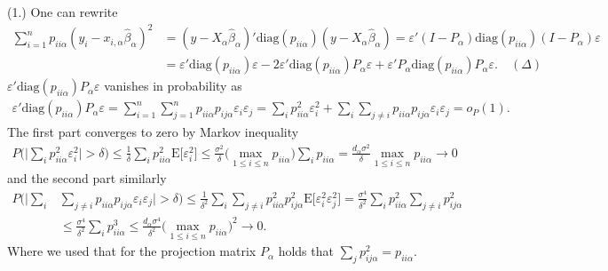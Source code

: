 \documentclass[Research_Module_ES.tex]{subfiles}
\begin{document}
(1.) One can rewrite 
\begin{align*}
\sum_{i=1}^n p_{ii\alpha}(y_i-x_{i,\alpha}\hat{\beta}_\alpha)^2 &= (y-X_\alpha\hat{\beta}_\alpha)'\mathrm{diag}(p_{ii\alpha})(y-X_\alpha\hat{\beta}_\alpha) 
= \varepsilon'(I-P_\alpha)\mathrm{diag}(p_{ii\alpha})(I-P_\alpha)\varepsilon\\
&= \varepsilon'\mathrm{diag}(p_{ii\alpha})\varepsilon-2\varepsilon'\mathrm{diag}(p_{ii\alpha})P_\alpha\varepsilon+\varepsilon'P_\alpha\mathrm{diag}(p_{ii\alpha})P_\alpha \varepsilon. \quad (\Delta)
\end{align*}
$\varepsilon'\mathrm{diag}(p_{ii\alpha})P_\alpha\varepsilon$ vanishes in probability as
\begin{align*}
\varepsilon'\mathrm{diag}(p_{ii\alpha})P_\alpha\varepsilon= \sum_{i=1}^n\sum_{j=1}^np_{ii\alpha}p_{ij\alpha}\varepsilon_i\varepsilon_j
=\sum_{i}p_{ii\alpha}^2\varepsilon_i^2 + \sum_{i}\sum_{j\neq i}p_{ii\alpha}p_{ij\alpha}\varepsilon_i\varepsilon_j=o_P(1).
\end{align*}
The first part converges to zero by Markov inequality 
\begin{align*}
P\biggl(\biggl|\sum_{i}p_{ii\alpha}^2\varepsilon_i^2\biggr|>\delta\biggr)
\le \frac{1}{\delta}\sum_{i}p_{ii\alpha}^2\mathrm{E}\bigl[\varepsilon_i^2\bigr]
\le \frac{\sigma^2}{\delta}\biggl(\max_{1\le i\le n}p_{ii\alpha}\biggr) \sum_{i}p_{ii\alpha} 
= \frac{d_\alpha\sigma^2}{\delta}\max_{1\le i\le n}p_{ii\alpha} \to 0 
\end{align*}
and the second part similarly 
\begin{align*}
P\biggl(\biggl|\sum_{i}&\sum_{j\neq i}p_{ii\alpha}p_{ij\alpha}\varepsilon_i\varepsilon_j\biggr|>\delta\biggr)\le\frac{1}{\delta^2}\sum_{i}\sum_{j\neq i}p_{ii\alpha}^2p_{ij\alpha}^2\mathrm{E}\bigl[\varepsilon_i^2\varepsilon_j^2\bigr]
= \frac{\sigma^4}{\delta^2}\sum_{i}p_{ii\alpha}^2\sum_{j\neq i}p_{ij\alpha}^2\\
&\le \frac{\sigma^4}{\delta^2}\sum_{i}p_{ii\alpha}^3 \le \frac{d_\alpha\sigma^4}{\delta^2}\biggl(\max_{1\le i\le n}p_{ii\alpha}\biggr)^2 \to 0.
\end{align*}
Where we used that for the projection matrix $P_\alpha$ holds that $\sum_{j}p_{ij\alpha}^2=p_{ii\alpha}$.\\
\end{document}
